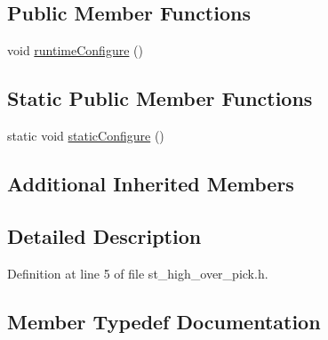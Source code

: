 \subsection*{Public Member Functions}
\begin{DoxyCompactItemize}
\item 
void \hyperlink{structsm__moveit__3_1_1StHighOverPick_ad1cbb7d9d2819d73850de1613b6cad9a}{runtime\+Configure} ()
\end{DoxyCompactItemize}
\subsection*{Static Public Member Functions}
\begin{DoxyCompactItemize}
\item 
static void \hyperlink{structsm__moveit__3_1_1StHighOverPick_a9056a1e6e003221a6a21ae8239633ba0}{static\+Configure} ()
\end{DoxyCompactItemize}
\subsection*{Additional Inherited Members}


\subsection{Detailed Description}


Definition at line 5 of file st\+\_\+high\+\_\+over\+\_\+pick.\+h.



\subsection{Member Typedef Documentation}
\mbox{\label{structsm__moveit__3_1_1StHighOverPick_a0ff9cdee9431fa286043ed34356f7ce3}} 

